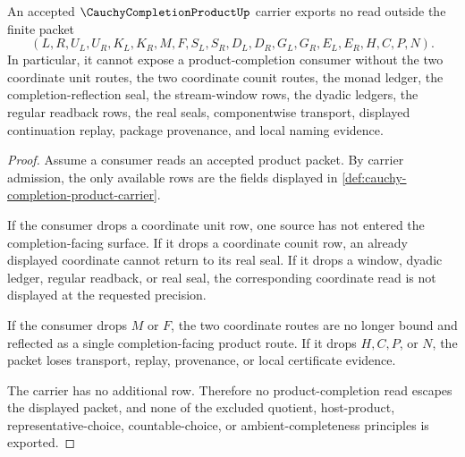 \begin{theorem}
\label{thm:cauchy-completion-product-nonescape}
An accepted $\CauchyCompletionProductUp$ carrier exports no read outside the finite packet
$$
(L,R,U_L,U_R,K_L,K_R,M,F,S_L,S_R,D_L,D_R,G_L,G_R,E_L,E_R,H,C,P,N).
$$
In particular, it cannot expose a product-completion consumer without the two coordinate unit routes, the two coordinate counit routes, the monad ledger, the completion-reflection seal, the stream-window rows, the dyadic ledgers, the regular readback rows, the real seals, componentwise transport, displayed continuation replay, package provenance, and local naming evidence.
\end{theorem}
\begin{proof}
Assume a consumer reads an accepted product packet. By carrier admission, the only available rows are the fields displayed in \autoref{def:cauchy-completion-product-carrier}.

If the consumer drops a coordinate unit row, one source has not entered the completion-facing surface. If it drops a coordinate counit row, an already displayed coordinate cannot return to its real seal. If it drops a window, dyadic ledger, regular readback, or real seal, the corresponding coordinate read is not displayed at the requested precision.

If the consumer drops $M$ or $F$, the two coordinate routes are no longer bound and reflected as a single completion-facing product route. If it drops $H,C,P$, or $N$, the packet loses transport, replay, provenance, or local certificate evidence.

The carrier has no additional row. Therefore no product-completion read escapes the displayed packet, and none of the excluded quotient, host-product, representative-choice, countable-choice, or ambient-completeness principles is exported.
\end{proof}

